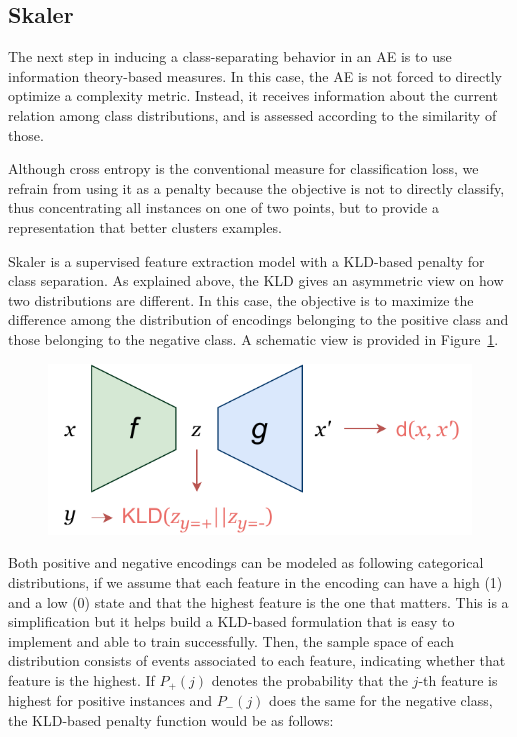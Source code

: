 \subsection{Skaler}

The next step in inducing a class-separating behavior in an AE is to use information theory-based measures. In this case, the AE is not forced to directly optimize a complexity metric. Instead, it receives information about the current relation among class distributions, and is assessed according to the similarity of those.

Although cross entropy is the conventional measure for classification loss, we refrain from using it as a penalty because the objective is not to directly classify, thus concentrating all instances on one of two points, but to provide a representation that better clusters examples.

Skaler is a supervised feature extraction model with a KLD-based penalty for class separation. As explained above, the KLD gives an asymmetric view on how two distributions are different. In this case, the objective is to maximize the difference among the distribution of encodings belonging to the positive class and those belonging to the negative class. A schematic view is provided in Figure~\ref{p6fig.skaler}.

\begin{figure}[ht]
  \centering
  \includegraphics[width=.35\textwidth]{skaler.pdf}
  \caption{\label{p6fig.skaler}}
\end{figure}

Both positive and negative encodings can be modeled as following categorical distributions, if we assume that each feature in the encoding can have a high (1) and a low (0) state and that the highest feature is the one that matters. This is a simplification but it helps build a KLD-based formulation that is easy to implement and able to train successfully. Then, the sample space of each distribution consists of events associated to each feature, indicating whether that feature is the highest. If $P_+(j)$ denotes the probability that the $j$-th feature is highest for positive instances and $P_-(j)$ does the same for the negative class, the KLD-based penalty function would be as follows:

